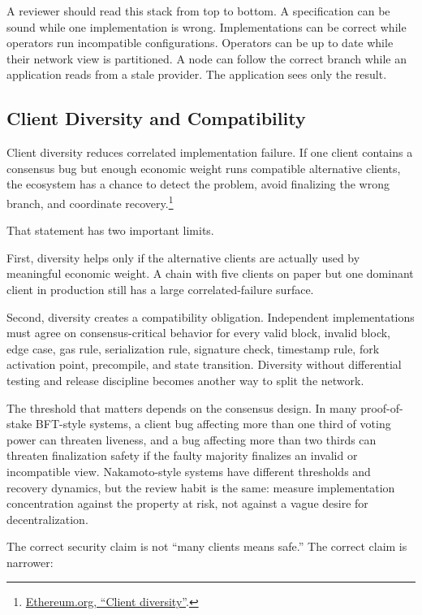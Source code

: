 A reviewer should read this stack from top to bottom. A specification can be sound while one implementation is wrong. Implementations can be correct while operators run incompatible configurations. Operators can be up to date while their network view is partitioned. A node can follow the correct branch while an application reads from a stale provider. The application sees only the result.

\subsection{Client Diversity and Compatibility}

Client diversity reduces correlated implementation failure. If one client contains a consensus bug but enough economic weight runs compatible alternative clients, the ecosystem has a chance to detect the problem, avoid finalizing the wrong branch, and coordinate recovery.\footnote{\href{https://ethereum.org/developers/docs/nodes-and-clients/client-diversity/}{Ethereum.org, ``Client diversity''}.}

That statement has two important limits.

First, diversity helps only if the alternative clients are actually used by meaningful economic weight. A chain with five clients on paper but one dominant client in production still has a large correlated-failure surface.

Second, diversity creates a compatibility obligation. Independent implementations must agree on consensus-critical behavior for every valid block, invalid block, edge case, gas rule, serialization rule, signature check, timestamp rule, fork activation point, precompile, and state transition. Diversity without differential testing and release discipline becomes another way to split the network.

The threshold that matters depends on the consensus design. In many proof-of-stake BFT-style systems, a client bug affecting more than one third of voting power can threaten liveness, and a bug affecting more than two thirds can threaten finalization safety if the faulty majority finalizes an invalid or incompatible view. Nakamoto-style systems have different thresholds and recovery dynamics, but the review habit is the same: measure implementation concentration against the property at risk, not against a vague desire for decentralization.

The correct security claim is not ``many clients means safe.'' The correct claim is narrower:

